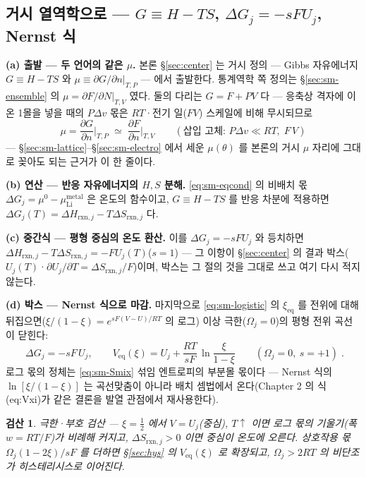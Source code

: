 \documentclass[11pt,a4paper]{article}
\newtheorem*{verifybox}{검산}
\newcommand{\eq}{\mathrm{eq}}
\newcommand{\rxn}{\mathrm{rxn}}
\begin{document}
\subsection{거시 열역학으로 --- $G\equiv H-TS$, $\Delta G_j=-sFU_j$, Nernst 식}\label{sec:sm-macro}
\textbf{(a) 출발 --- 두 언어의 같은 $\mu$.} 본론 \S\ref{sec:center} 는 거시 정의 --- Gibbs 자유에너지
$G\equiv H-TS$ 와 $\mu\equiv\partial G/\partial n|_{T,P}$ --- 에서 출발한다. 통계역학 쪽 정의는
\S\ref{sec:sm-ensemble} 의 $\mu=\partial F/\partial N|_{T,V}$ 였다. 둘의 다리는 $G=F+PV$ 다 --- 응축상
격자에 이온 1몰을 넣을 때의 $P\Delta v$ 몫은 $RT$·전기 일($FV$) 스케일에 비해 무시되므로
\begin{equation}
\mu=\frac{\partial G}{\partial n}\Big|_{T,P}\;\simeq\;\frac{\partial F}{\partial n}\Big|_{T,V}
\qquad(\text{삽입 고체: }P\Delta v\ll RT,\;F\,V)
\label{eq:sm-mubridge}
\end{equation}
--- \S\ref{sec:sm-lattice}--\S\ref{sec:sm-electro} 에서 세운 $\mu(\theta)$ 를 본론의 거시 $\mu$ 자리에
그대로 꽂아도 되는 근거가 이 한 줄이다.

\textbf{(b) 연산 --- 반응 자유에너지의 $H,S$ 분해.} \eqref{eq:sm-eqcond} 의 비배치 몫
$\Delta G_j=\mu^0-\mu_\mathrm{Li}^\mathrm{metal}$ 은 온도의 함수이고, $G\equiv H-TS$ 를 반응 차분에 적용하면
$\Delta G_j(T)=\Delta H_{\rxn,j}-T\Delta S_{\rxn,j}$ 다.

\textbf{(c) 중간식 --- 평형 중심의 온도 환산.}
이를 $\Delta G_j=-sFU_j$ 와 등치하면 $\Delta H_{\rxn,j}-T\Delta S_{\rxn,j}=-FU_j(T)$($s{=}1$) --- 그 이항이
\S\ref{sec:center} 의 결과 박스($U_j(T)$·$\partial U_j/\partial T=\Delta S_{\rxn,j}/F$)이며, 박스는 그 절의
것을 그대로 쓰고 여기 다시 적지 않는다.

\textbf{(d) 박스 --- Nernst 식으로 마감.} 마지막으로 \eqref{eq:sm-logistic} 의 $\xi_\eq$ 를 전위에 대해
뒤집으면($\xi/(1-\xi)=e^{sF(V-U)/RT}$ 의 로그) 이상 극한($\Omega_j=0$)의 평형 전위 곡선이 닫힌다:
\begin{equation}
\boxed{\;
\Delta G_j=-sF\,U_j,
\qquad
V_\eq(\xi)=U_j+\frac{RT}{sF}\,\ln\frac{\xi}{1-\xi}
\qquad(\Omega_j=0,\ s=+1)\;.}
\label{eq:sm-nernst}
\end{equation}
로그 몫의 정체는 \eqref{eq:sm-Smix} 섞임 엔트로피의 부분몰 몫이다 --- Nernst 식의 $\ln[\xi/(1-\xi)]$ 는
곡선맞춤이 아니라 배치 셈법에서 온다(Chapter 2 의 식 (eq:Vxi)가 같은 결론을 발열 관점에서 재사용한다).
\begin{verifybox}
극한·부호 검산 --- $\xi=\tfrac12$ 에서 $V=U_j$(중심), $T\!\uparrow$ 이면 로그 몫의 기울기(폭 $w=RT/F$)가
비례해 커지고, $\Delta S_{\rxn,j}>0$ 이면 중심이 온도에 오른다. 상호작용 몫 $\Omega_j(1-2\xi)/sF$ 를 더하면
\S\ref{sec:hys} 의 $V_\eq(\xi)$ 로 확장되고, $\Omega_j>2RT$ 의 비단조가 히스테리시스로 이어진다.
\end{verifybox}
\end{document}
